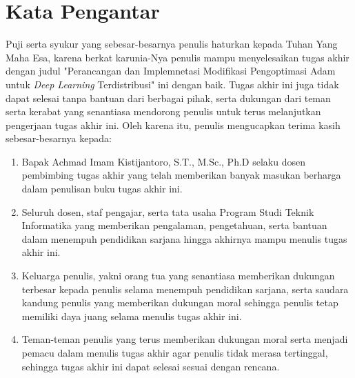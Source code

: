 \chapter*{Kata Pengantar}

Puji serta syukur yang sebesar-besarnya penulis haturkan kepada Tuhan Yang Maha Esa, karena berkat karunia-Nya penulis mampu menyelesaikan tugas akhir dengan judul "Perancangan dan Implemnetasi Modifikasi Pengoptimasi Adam untuk \emph{Deep Learning} Terdistribusi" ini dengan baik. Tugas akhir ini juga tidak dapat selesai tanpa bantuan dari berbagai pihak, serta dukungan dari teman serta kerabat yang senantiasa mendorong penulis untuk terus melanjutkan pengerjaan tugas akhir ini. Oleh karena itu, penulis mengucapkan terima kasih sebesar-besarnya kepada:

\begin{enumerate}
  \item Bapak Achmad Imam Kistijantoro, S.T., M.Sc., Ph.D selaku dosen pembimbing tugas akhir yang telah memberikan banyak masukan berharga dalam penulisan buku tugas akhir ini.
  \item Seluruh dosen, staf pengajar, serta tata usaha Program Studi Teknik Informatika yang memberikan pengalaman, pengetahuan, serta bantuan dalam menempuh pendidikan sarjana hingga akhirnya mampu menulis tugas akhir ini.
  \item Keluarga penulis, yakni orang tua yang senantiasa memberikan dukungan terbesar kepada penulis selama menempuh pendidikan sarjana, serta saudara kandung penulis yang memberikan dukungan moral sehingga penulis tetap memiliki daya juang selama menulis tugas akhir ini.
  \item Teman-teman penulis yang terus memberikan dukungan moral serta menjadi pemacu dalam menulis tugas akhir agar penulis tidak merasa tertinggal, sehingga tugas akhir ini dapat selesai sesuai dengan rencana.
\end{enumerate}
